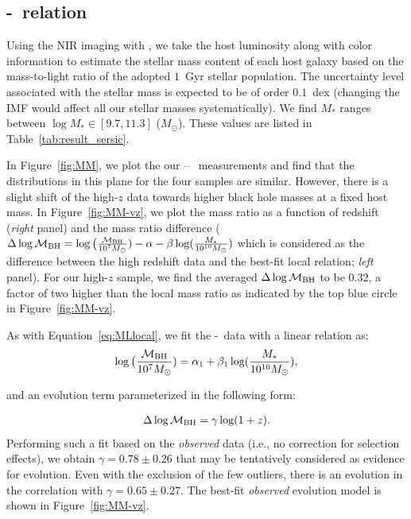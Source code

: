 \documentclass[apj]{emulateapj}
\begin{document}
\subsection{\mbh-\smass\ relation}\label{sec:mm}

Using the NIR imaging with \hst, we take the host luminosity along with color information to estimate the stellar mass content of each host galaxy based on the mass-to-light ratio of the adopted  $1$~Gyr stellar population. The uncertainty level associated with the stellar mass is expected to be of order $0.1$~dex (changing the IMF would affect all our stellar masses systematically). We find $M_*$ ranges between $\log M_* \in [9.7, 11.3]$ ($M_{\odot}$). These values are listed in Table~\ref{tab:result_sersic}. 

In Figure~\ref{fig:MM}, we plot the our \mbh -- \smass\ measurements and find that the distributions in this plane for the four samples are similar. However, there is a slight shift of the high-$z$ data towards higher black hole masses at a fixed host mass. In Figure~\ref{fig:MM-vz}, we plot the mass ratio as a function of redshift ({\it right} panel) and the mass ratio difference ($\Delta \log \mathcal M_{\rm BH} = \log \big( \frac{\mathcal M_{\rm  BH}}{10^{7}M_{\odot}}) -\alpha-\beta\log(\frac{M_*}{10^{10}M_{\odot}})$ which is considered as the difference between the high redshift data and the best-fit local relation; {\it left} panel). For our high-$z$ sample, we find the averaged $\Delta \log \mathcal M_{\rm BH}$ to be $0.32$, a factor of two higher than the local mass ratio as indicated by the top blue circle in Figure~\ref{fig:MM-vz}.

As with Equation~\ref{eq:MLlocal}, we fit the \mbh-\smass\ data with a linear relation as:
\begin{eqnarray}
\label{eq:MMlocal}
\log \big( \frac{\mathcal M_{\rm BH}}{10^{7}M_{\odot}})= \alpha_1 + \beta_1 \log(\frac{M_*}{10^{10}M_{\odot}}),
\end {eqnarray}

\noindent and an evolution term parameterized in the following form:

\begin{eqnarray}
\label{eq:offset}
\Delta \log \mathcal M_{\rm BH}= \gamma \log (1 + z).
\end{eqnarray} 
Performing such a fit based on the {\it observed} data (i.e., no correction for selection effects), we obtain $\gamma  = 0.78 \pm 0.26$ that may be tentatively considered as evidence for evolution. Even with the exclusion of the few outliers, there is an evolution in the correlation with $\gamma  = 0.65 \pm 0.27$. The best-fit {\it observed} evolution model is shown in Figure~\ref{fig:MM-vz}.
\end{document}
